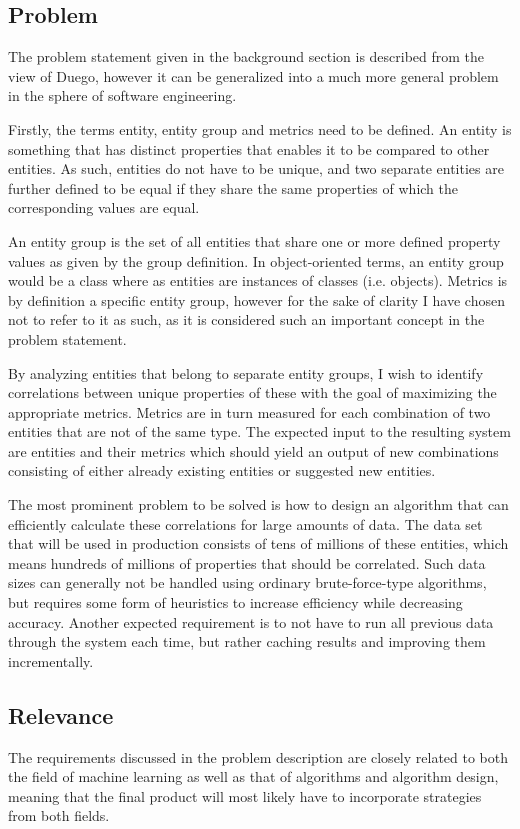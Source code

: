 \documentclass[a4paper]{article}
\begin{document}
\subsection{Problem}
The problem statement given in the background section is described from the view of Duego, however it can be generalized into 
a much more general problem in the sphere of software engineering.

Firstly, the terms entity, entity group and metrics need to be defined. An entity is something that has distinct properties 
that enables it to be compared to other entities. As such, entities do not have to be unique, and two separate entities are 
further defined to be equal if they share the same properties of which the corresponding values are equal.

An entity group is the set of all entities that share one or more defined property values as given by the group definition. 
In object-oriented terms, an entity group would be a class where as entities are instances of classes (i.e. objects). Metrics 
is by definition a specific entity group, however for the sake of clarity I have chosen not to refer to it as such, as it is 
considered such an important concept in the problem statement.

By analyzing entities that belong to separate entity groups, I wish to identify correlations between unique properties of 
these with the goal of maximizing the appropriate metrics. Metrics are in turn measured for each combination of two entities 
that are not of the same type. The expected input to the resulting system are entities and their metrics which should yield 
an output of new combinations consisting of either already existing entities or suggested new entities.

The most prominent problem to be solved is how to design an algorithm that can efficiently calculate these correlations for 
large amounts of data. The data set that will be used in production consists of tens of millions of these entities, which 
means hundreds of millions of properties that should be correlated. Such data sizes can generally not be handled using 
ordinary brute-force-type algorithms, but requires some form of heuristics to increase efficiency while decreasing accuracy. 
Another expected requirement is to not have to run all previous data through the system each time, but rather caching results 
and improving them incrementally.

\subsection{Relevance}
The requirements discussed in the problem description are closely related to both the field of machine learning as well as 
that of algorithms and algorithm design, meaning that the final product will most likely have to incorporate strategies from 
both fields.
\end{document}
